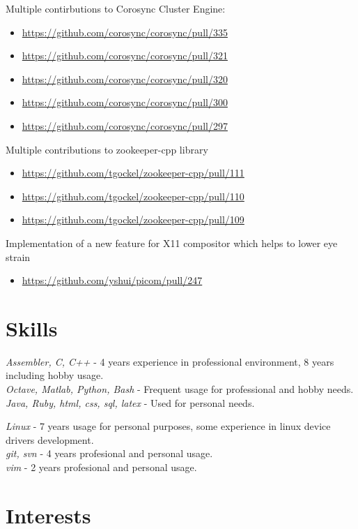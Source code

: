 \documentclass[12]{article}
\begin{document}
{
Multiple contirbutions to Corosync Cluster Engine:
\begin{itemize}
	\item \url{https://github.com/corosync/corosync/pull/335}
	\item \url{https://github.com/corosync/corosync/pull/321}
	\item \url{https://github.com/corosync/corosync/pull/320}
	\item \url{https://github.com/corosync/corosync/pull/300}
	\item \url{https://github.com/corosync/corosync/pull/297}
\end{itemize}
}

{
Multiple contributions to zookeeper-cpp library
\begin{itemize}
	\item \url{https://github.com/tgockel/zookeeper-cpp/pull/111}
	\item \url{https://github.com/tgockel/zookeeper-cpp/pull/110}
	\item \url{https://github.com/tgockel/zookeeper-cpp/pull/109}
\end{itemize}
}

{
Implementation of a new feature for X11 compositor which helps to lower eye strain
\begin{itemize}
	\item \url{https://github.com/yshui/picom/pull/247}
\end{itemize}
}





\section{Skills}

{
	\textit{Assembler, C, C++} - 4 years experience in professional environment, 8 years including hobby usage.\\
	\textit{Octave, Matlab, Python, Bash} - Frequent usage for professional and hobby needs.\\
	\textit{Java, Ruby, html, css, sql, latex} - Used for personal needs. \\

}

{
	\textit{Linux} - 7 years usage for personal purposes, some experience in linux device drivers development.\\
	\textit{git, svn} - 4 years profesional and personal usage.\\
	\textit{vim} - 2 years profesional and personal usage.\\
}


\section{Interests}

\end{document}
